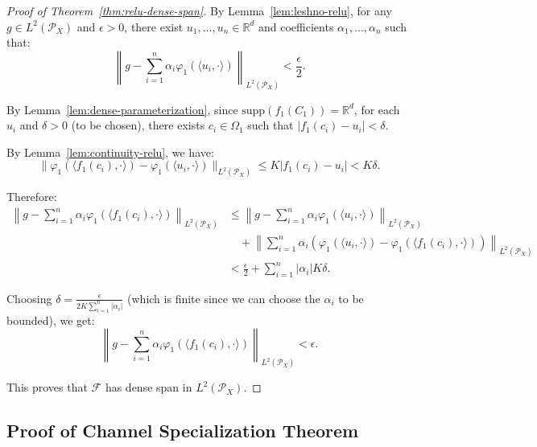 \documentclass[11pt]{article}
\newcommand{\1}{\mathbbm{1}}
\begin{document}
\begin{proof}[Proof of Theorem~\ref{thm:relu-dense-span}]
By Lemma~\ref{lem:leshno-relu}, for any $g \in L^2(\mathcal{P}_X)$ and $\epsilon > 0$, there exist $u_1, \ldots, u_n \in \mathbb{R}^d$ and coefficients $\alpha_1, \ldots, \alpha_n$ such that:
\[
\left\|g - \sum_{i=1}^n \alpha_i \varphi_1(\langle u_i, \cdot\rangle)\right\|_{L^2(\mathcal{P}_X)} < \frac{\epsilon}{2}.
\]

By Lemma~\ref{lem:dense-parameterization}, since $\text{supp}(f_1(C_1)) = \mathbb{R}^d$, for each $u_i$ and $\delta > 0$ (to be chosen), there exists $c_i \in \Omega_1$ such that $|f_1(c_i) - u_i| < \delta$.

By Lemma~\ref{lem:continuity-relu}, we have:
\[
\|\varphi_1(\langle f_1(c_i), \cdot\rangle) - \varphi_1(\langle u_i, \cdot\rangle)\|_{L^2(\mathcal{P}_X)} \le K |f_1(c_i) - u_i| < K\delta.
\]

Therefore:
\begin{align*}
\left\|g - \sum_{i=1}^n \alpha_i \varphi_1(\langle f_1(c_i), \cdot\rangle)\right\|_{L^2(\mathcal{P}_X)}
&\le \left\|g - \sum_{i=1}^n \alpha_i \varphi_1(\langle u_i, \cdot\rangle)\right\|_{L^2(\mathcal{P}_X)}\\
&\quad + \left\|\sum_{i=1}^n \alpha_i (\varphi_1(\langle u_i, \cdot\rangle) - \varphi_1(\langle f_1(c_i), \cdot\rangle))\right\|_{L^2(\mathcal{P}_X)}\\
&< \frac{\epsilon}{2} + \sum_{i=1}^n |\alpha_i| K\delta.
\end{align*}

Choosing $\delta = \frac{\epsilon}{2K \sum_{i=1}^n |\alpha_i|}$ (which is finite since we can choose the $\alpha_i$ to be bounded), we get:
\[
\left\|g - \sum_{i=1}^n \alpha_i \varphi_1(\langle f_1(c_i), \cdot\rangle)\right\|_{L^2(\mathcal{P}_X)} < \epsilon.
\]

This proves that $\mathcal{F}$ has dense span in $L^2(\mathcal{P}_X)$.
\end{proof}

\subsection{Proof of Channel Specialization Theorem}
\label{app:r2-logratio-proof}
\end{document}
